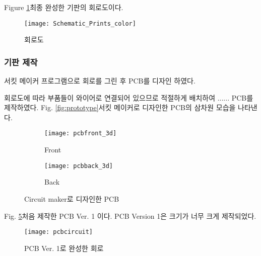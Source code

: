 Figure \ref{fig:Schematic_Prints}\는 최종 완성한 기판의 회로도이다.
\begin{figure}
	\begin{center}
	\texttt{[image: Schematic\_Prints\_color]}
	\caption{회로도}
	\label{fig:Schematic_Prints}
	\end{center}
\end{figure}


\subsubsection{기판 제작}
서킷 메이커 프로그램으로 회로를 그린 후 PCB를 디자인 하였다. 


회로도에 따라 부품들이 와이어로 연결되어 있으므로 적절하게 배치하여 ......    PCB를 제작하였다. Fig. \ref{fig:prototype}\은 서킷 메이커로 디자인한 PCB의 삼차원 모습을 나타낸다.

\begin{figure}[h]
	\begin{center}
	\begin{subfigure}{0.45\textwidth}
		\texttt{[image: pcbfront\_3d]} 
		\caption{Front}
		\label{fig:pcbfront_3d}
	\end{subfigure}
	\begin{subfigure}{0.45\textwidth}
		\texttt{[image: pcbback\_3d]}
		\caption{Back}
		\label{fig:pcbback_3d}
	\end{subfigure}
	\caption{Circuit maker로 디자인한 PCB}
	\label{fig:pcb}
	\end{center}
\end{figure}

Fig. \ref{fig:pcbcircuit}\은 처음 제작한 PCB Ver. 1 이다. PCB Version 1은 크기가 너무 크게 제작되었다.
\begin{figure}[H]
	\begin{center}
		\texttt{[image: pcbcircuit]}
		\caption{PCB Ver. 1로 완성한 회로}
		\label{fig:pcbcircuit}
	\end{center}
\end{figure}




